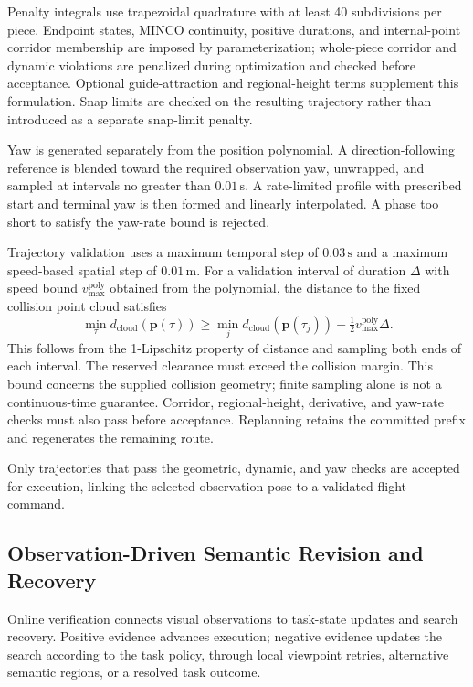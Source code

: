 \documentclass[letterpaper,10pt,journal]{IEEEtran}
\begin{document}
Penalty integrals use trapezoidal quadrature with at least 40 subdivisions per piece. Endpoint states, MINCO continuity, positive durations, and internal-point corridor membership are imposed by parameterization; whole-piece corridor and dynamic violations are penalized during optimization and checked before acceptance. Optional guide-attraction and regional-height terms supplement this formulation. Snap limits are checked on the resulting trajectory rather than introduced as a separate snap-limit penalty.

Yaw is generated separately from the position polynomial. A direction-following reference is blended toward the required observation yaw, unwrapped, and sampled at intervals no greater than $0.01\,\mathrm s$. A rate-limited profile with prescribed start and terminal yaw is then formed and linearly interpolated. A phase too short to satisfy the yaw-rate bound is rejected.

Trajectory validation uses a maximum temporal step of $0.03\,\mathrm s$ and a maximum speed-based spatial step of $0.01\,\mathrm m$. For a validation interval of duration $\Delta$ with speed bound $v_{\max}^{\mathrm{poly}}$ obtained from the polynomial, the distance to the fixed collision point cloud satisfies
\begin{equation}
\min_{\tau}d_{\mathrm{cloud}}(\mathbf p(\tau))
\geq \min_j d_{\mathrm{cloud}}(\mathbf p(\tau_j))
-\tfrac12v_{\max}^{\mathrm{poly}}\Delta.
\label{eq:clearance-bound}
\end{equation}
This follows from the 1-Lipschitz property of distance and sampling both ends of each interval. The reserved clearance must exceed the collision margin. This bound concerns the supplied collision geometry; finite sampling alone is not a continuous-time guarantee. Corridor, regional-height, derivative, and yaw-rate checks must also pass before acceptance. Replanning retains the committed prefix and regenerates the remaining route.

Only trajectories that pass the geometric, dynamic, and yaw checks are accepted for execution, linking the selected observation pose to a validated flight command.

\subsection{Observation-Driven Semantic Revision and Recovery}
\label{sec:recovery}

Online verification connects visual observations to task-state updates and search recovery. Positive evidence advances execution; negative evidence updates the search according to the task policy, through local viewpoint retries, alternative semantic regions, or a resolved task outcome.
\end{document}
